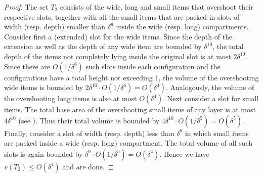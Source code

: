 \documentclass[10pt,a4paper]{amsart}
\newcommand{\tNFDH}{\texttt{3D-NFDH}\xspace}
\theoremstyle{definition}
\begin{document}
\begin{proof}
The set $T_2$ consists of the wide, long and small items that overshoot their respective slots, together with all the small items that are packed in slots of width (resp. depth) smaller than $\delta^9$ inside the wide (resp. long) compartments. Consider first a (extended) slot for the wide items. Since the depth of the extension as well as the depth of any wide item are bounded by $\delta^{10}$, the total depth of the items not completely lying inside the original slot is at most $2\delta^{10}$. Since there are $O(1/\delta^6)$ such slots inside each configuration and the configurations have a total height not exceeding 1, the volume of the overshooting wide items is bounded by $2\delta^{10}\cdot O(1/\delta^6) = O(\delta^4)$. Analogously, the volume of the overshooting long items is also at most $O(\delta^4)$. Next consider a slot for small items. The total base area of the overshooting small items of any layer is at most $4\delta^{10}$ (see ). Thus their total volume is bounded by $4\delta^{10}\cdot O(1/\delta^5)=O(\delta^5)$. Finally, consider a slot of width (resp. depth) less than $\delta^9$ in which small items are packed inside a wide (resp. long) compartment. The total volume of all such slots is again bounded by $\delta^9\cdot O(1/\delta^5)=O(\delta^4)$. Hence we have $v(T_2)\le O(\delta^4)$ and are done.
\end{proof}
\end{document}

